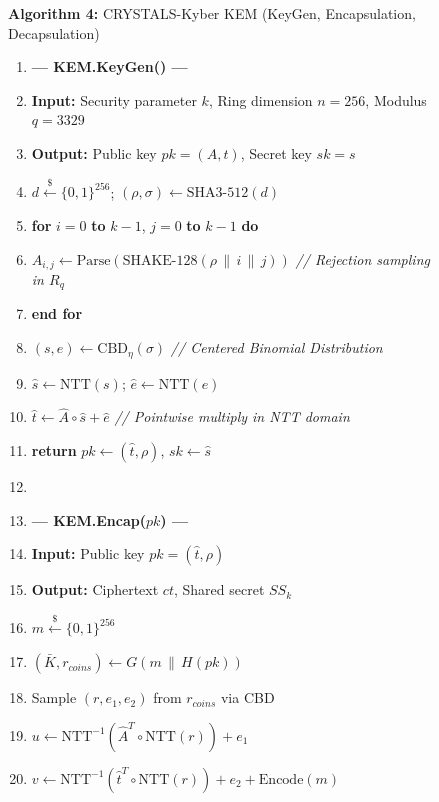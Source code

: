 \documentclass[journal, 10pt, twocolumn]{IEEEtran}
\begin{document}
\begin{figure}[!t]
\hrulefill
\vspace{-0.2cm}
\begin{center}
\textbf{Algorithm 4:} CRYSTALS-Kyber KEM (KeyGen, Encapsulation, Decapsulation)
\end{center}
\vspace{-0.2cm}
\hrulefill
\begin{enumerate}
    \item[] \textbf{--- KEM.KeyGen() ---}
    \item \textbf{Input:} Security parameter $k$, Ring dimension $n = 256$, Modulus $q = 3329$
    \item \textbf{Output:} Public key $pk = (A, t)$, Secret key $sk = s$
    \item $d \xleftarrow{\$} \{0,1\}^{256}$; \quad $(\rho, \sigma) \leftarrow \text{SHA3-512}(d)$
    \item \textbf{for} $i = 0$ \textbf{to} $k-1$, $j = 0$ \textbf{to} $k-1$ \textbf{do}
    \item \quad $A_{i,j} \leftarrow \text{Parse}(\text{SHAKE-128}(\rho \,\|\, i \,\|\, j))$ \quad \textit{// Rejection sampling in $R_q$}
    \item \textbf{end for}
    \item $(s, e) \leftarrow \text{CBD}_{\eta}(\sigma)$ \quad \textit{// Centered Binomial Distribution}
    \item $\hat{s} \leftarrow \text{NTT}(s)$; \quad $\hat{e} \leftarrow \text{NTT}(e)$
    \item $\hat{t} \leftarrow \hat{A} \circ \hat{s} + \hat{e}$ \quad \textit{// Pointwise multiply in NTT domain}
    \item \textbf{return} $pk \leftarrow (\hat{t}, \rho)$, $sk \leftarrow \hat{s}$
    \item[]
    \item[] \textbf{--- KEM.Encap($pk$) ---}
    \item \textbf{Input:} Public key $pk = (\hat{t}, \rho)$
    \item \textbf{Output:} Ciphertext $ct$, Shared secret $SS_k$
    \item $m \xleftarrow{\$} \{0,1\}^{256}$
    \item $(\bar{K}, r_{coins}) \leftarrow G(m \,\|\, H(pk))$
    \item Sample $(r, e_1, e_2)$ from $r_{coins}$ via CBD
    \item $u \leftarrow \text{NTT}^{-1}(\hat{A}^T \circ \text{NTT}(r)) + e_1$
    \item $v \leftarrow \text{NTT}^{-1}(\hat{t}^T \circ \text{NTT}(r)) + e_2 + \text{Encode}(m)$

\end{enumerate}
\end{figure}
\end{document}
